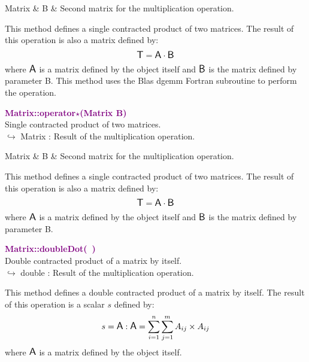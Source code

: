 \begin{tcolorbox}[width=\textwidth,myArgs,tabularx={ll|R}]
Matrix & B & Second matrix for the multiplication operation.
\end{tcolorbox}

This method defines a single contracted product of two matrices.
The result of this operation is also a matrix defined by:
\begin{equation*}
\mbox{\large\ensuremath{\mathsf{T}}} = \mbox{\large\ensuremath{\mathsf{A}}} \cdot \mbox{\large\ensuremath{\mathsf{B}}}
\end{equation*}
where $\mbox{\large\ensuremath{\mathsf{A}}}$ is a matrix defined by the object itself and $\mbox{\large\ensuremath{\mathsf{B}}}$ is the matrix defined by parameter B.
This method uses the Blas \textsf{dgemm} Fortran subroutine to perform the operation.

\textcolor{purple}{\textbf{Matrix::operator$\star$(Matrix B)}}\label{Matrix::operator*(Matrix B)}\\
Single contracted product of two matrices.\\ \hspace*{10mm}$\hookrightarrow$ Matrix : Result of the multiplication operation.

\begin{tcolorbox}[width=\textwidth,myArgs,tabularx={ll|R}]
Matrix & B & Second matrix for the multiplication operation.
\end{tcolorbox}

This method defines a single contracted product of two matrices.
The result of this operation is also a matrix defined by:
\begin{equation*}
\mbox{\large\ensuremath{\mathsf{T}}} = \mbox{\large\ensuremath{\mathsf{A}}} \cdot \mbox{\large\ensuremath{\mathsf{B}}}
\end{equation*}
where $\mbox{\large\ensuremath{\mathsf{A}}}$ is a matrix defined by the object itself and $\mbox{\large\ensuremath{\mathsf{B}}}$ is the matrix defined by parameter B.

\textcolor{purple}{\textbf{Matrix::doubleDot(~)}}\label{Matrix::doubleDot()}\\
Double contracted product of a matrix by itself.\\ \hspace*{10mm}$\hookrightarrow$ double : Result of the multiplication operation.

This method defines a double contracted product of a matrix by itself.
The result of this operation is a scalar $s$ defined by:
\begin{equation*}
s = \mbox{\large\ensuremath{\mathsf{A}}} : \mbox{\large\ensuremath{\mathsf{A}}} = \sum_{i=1}^{n} \sum_{j=1}^{m} A_{ij}\times A_{ij}
\end{equation*}
where $\mbox{\large\ensuremath{\mathsf{A}}}$ is a matrix defined by the object itself.

